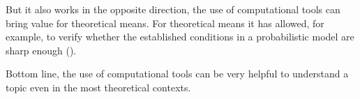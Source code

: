 But it also works in the opposite direction, the use of computational tools can bring value for theoretical means. For theoretical means it has allowed, for example, to verify whether the established conditions in a probabilistic model are sharp enough (\cite[Aronshtam 13]{Meshulam13}).

Bottom line, the use of computational tools can be very helpful to understand a topic even in the most theoretical contexts.